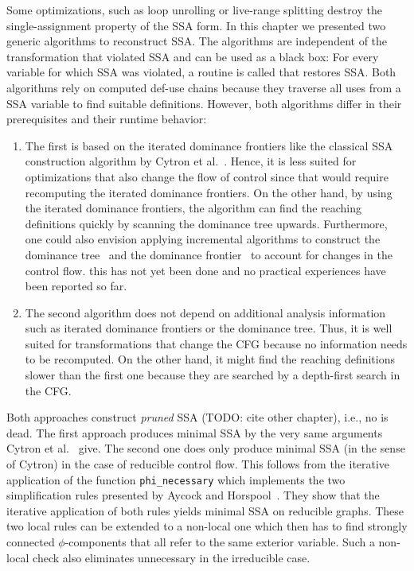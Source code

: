 Some optimizations, such as loop unrolling or live-range splitting destroy the single-assignment property of the SSA form.
In this chapter we presented two generic algorithms to reconstruct SSA.
The algorithms are independent of the transformation that violated SSA and can be used as a black box:
For every variable for which SSA was violated, a routine is called that restores SSA.
Both algorithms rely on computed def-use chains because they traverse all uses from a SSA variable to find suitable definitions.
However, both algorithms differ in their prerequisites and their runtime behavior:
\begin{enumerate}
	\item 
		The first is based on the iterated dominance frontiers like the classical SSA construction algorithm by Cytron et al.~\cite{cytron:1991:ssa}.
		Hence, it is less suited for optimizations that also change the flow of control since that would require recomputing the iterated dominance frontiers.
		On the other hand, by using the iterated dominance frontiers, the algorithm can find the reaching definitions quickly by scanning the dominance tree upwards.
		Furthermore, one could also envision applying incremental algorithms to construct the dominance tree~\cite{XXX} and the dominance frontier~\cite{YYY} to account for changes in the control flow. 
		this has not yet been done and no practical experiences have been reported so far.
	\item 
		The second algorithm does not depend on additional analysis information such as iterated dominance frontiers or the dominance tree.
		Thus, it is well suited for transformations that change the CFG because no information needs to be recomputed.
		On the other hand, it might find the reaching definitions slower than the first one because they are searched by a depth-first search in the CFG.
\end{enumerate}
Both approaches construct \emph{pruned} SSA (TODO: cite other chapter), i.e., no \phifun is dead. 
The first approach produces minimal SSA by the very same arguments Cytron et al.~\cite{cytron:1991:ssa} give.
The second one does only produce minimal SSA (in the sense of Cytron) in the case of reducible control flow. 
This follows from the iterative application of the function \verb|phi_necessary| which implements the two simplification rules presented by Aycock and Horspool~\cite{???}.
They show that the iterative application of both rules yields minimal SSA on reducible graphs. 
These two local rules can be extended to a non-local one which then has to find strongly connected $\phi$-components that all refer to the same exterior variable.
Such a non-local check also eliminates unnecessary \phifuns in the irreducible case.

